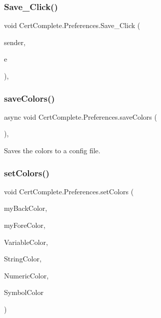 \subsubsection{\texorpdfstring{Save\+\_\+\+Click()}{Save\_Click()}}
{\footnotesize\ttfamily void Cert\+Complete.\+Preferences.\+Save\+\_\+\+Click (\begin{DoxyParamCaption}\item[{object}]{sender,  }\item[{Event\+Args}]{e }\end{DoxyParamCaption})\hspace{0.3cm}{\ttfamily [inline]}, {\ttfamily [private]}}

\mbox{\label{class_cert_complete_1_1_preferences_a700e02890b7d9aa6a4425f55c1aee837}} 
\subsubsection{\texorpdfstring{save\+Colors()}{saveColors()}}
{\footnotesize\ttfamily async void Cert\+Complete.\+Preferences.\+save\+Colors (\begin{DoxyParamCaption}{ }\end{DoxyParamCaption})\hspace{0.3cm}{\ttfamily [inline]}, {\ttfamily [private]}}



Saves the colors to a config file. 

\mbox{\label{class_cert_complete_1_1_preferences_ad2b97416252271eac8181d91641cd5bf}} 
\subsubsection{\texorpdfstring{set\+Colors()}{setColors()}}
{\footnotesize\ttfamily void Cert\+Complete.\+Preferences.\+set\+Colors (\begin{DoxyParamCaption}\item[{Color}]{my\+Back\+Color,  }\item[{Color}]{my\+Fore\+Color,  }\item[{Color}]{Variable\+Color,  }\item[{Color}]{String\+Color,  }\item[{Color}]{Numeric\+Color,  }\item[{Color}]{Symbol\+Color }\end{DoxyParamCaption})\hspace{0.3cm}{\ttfamily [inline]}}



